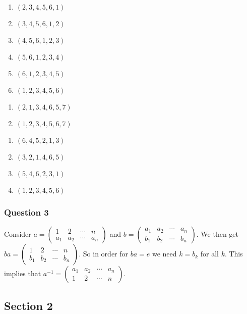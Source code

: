 \documentclass{article}
\begin{document}
\begin{enumerate}
	\item $(2,3,4,5,6,1)$
	\item $(3,4,5,6,1,2)$
	\item $(4,5,6,1,2,3)$
	\item $(5,6,1,2,3,4)$
	\item $(6,1,2,3,4,5)$
	\item $(1,2,3,4,5,6)$
\end{enumerate}

\begin{enumerate}
	\item $(2,1,3,4,6,5,7)$
	\item $(1,2,3,4,5,6,7)$
\end{enumerate}

\begin{enumerate}
	\item $(6,4,5,2,1,3)$
	\item $(3,2,1,4,6,5)$
	\item $(5,4,6,2,3,1)$
	\item $(1,2,3,4,5,6)$
\end{enumerate}

\subsubsection{Question 3}
Consider $a = \left(\begin{smallmatrix}
1&2&\cdots&n\\a_1&a_2&\cdots&a_n
\end{smallmatrix}\right)$ and $b =  \left(\begin{smallmatrix}
a_1&a_2&\cdots&a_n\\b_1&b_2&\cdots&b_n
\end{smallmatrix}\right)$. We then get $ba = \left(\begin{smallmatrix}
1&2&\cdots&n\\b_1&b_2&\cdots&b_n
\end{smallmatrix}\right)$. So in order for $ba = e$ we need $k = b_k$ for all $k$. This implies that $a^{-1} = \left(\begin{smallmatrix}
a_1&a_2&\cdots&a_n\\1&2&\cdots&n
\end{smallmatrix}\right)$.

\subsection{Section 2}
\end{document}
